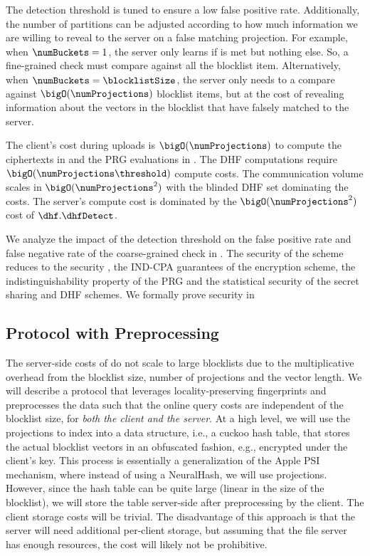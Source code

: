 The detection threshold is tuned to ensure a low false positive rate. Additionally, the number of partitions \numBuckets can be adjusted according to how much information we are willing to reveal to the server on a false matching projection. For example, when $\numBuckets = 1$, the server only learns if \detectionThreshold is met but nothing else. So, a fine-grained check must compare against all the blocklist item. Alternatively, when $\numBuckets = \blocklistSize$, the server only needs to a compare against $\bigO(\numProjections)$ blocklist items, but at the cost of revealing information about the vectors in the blocklist that have falsely matched to the server. 

%
The client's cost during uploads is $\bigO(\numProjections)$ to compute the ciphertexts in  and the PRG evaluations in . The DHF computations require $\bigO(\numProjections \threshold)$ compute costs. The communication volume scales in $\bigO(\numProjections^2)$ with the blinded DHF set dominating the costs.  
The server's compute cost is dominated by the $\bigO(\numProjections^2)$ cost of $\dhf.\dhfDetect$. 

We analyze the impact of the detection threshold on the false positive rate and false negative rate of the coarse-grained check in . The security of the scheme reduces to the security \protocolFM, the IND-CPA guarantees of the encryption scheme, the indistinguishability property of the PRG and the statistical security of the secret sharing and DHF schemes. We formally prove security in 


\iffalse
\subsection{Protocol with Preprocessing}
\label{sec:fm:pre}
%
The server-side costs of \protocolFM do not scale to large blocklists due to the multiplicative overhead from the blocklist size, number of projections and the vector length. We will describe a protocol that leverages locality-preserving fingerprints and preprocesses the data such that the online query costs are independent of the blocklist size, for \emph{both the client and the server}. At a high level, we will use the projections to index into a data structure, i.e., a cuckoo hash table, that stores the actual blocklist vectors in an obfuscated fashion, e.g., encrypted under the client's key. This process is essentially a generalization of the Apple PSI mechanism, where instead of using a NeuralHash, we will use projections. 
However, since the hash table can be quite large (linear in the size of the blocklist), we will store the table server-side after preprocessing by the client. The client storage costs will be trivial. The disadvantage of this approach is that the server will need additional per-client storage, but assuming that the file server has enough resources, the cost will likely not be prohibitive.



